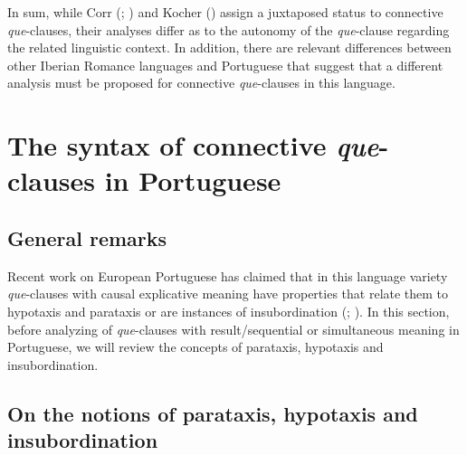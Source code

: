 \documentclass[output=paper,colorlinks,citecolor=brown,
]{langscibook}
\begin{document}
 \label{ex:matos:aproximate}
\z 

In sum, while Corr (\citeyear{corr_ibero-romance_2016}; \citeyear{corr_matrix_2018}) and Kocher (\citeyear{kocher_unselected_2019}) assign a juxtaposed status to connective \textit{que}-clauses, their analyses differ as to the autonomy of the \textit{que}-clause regarding the related linguistic context. In addition, there are relevant differences between other Iberian Romance languages and Portuguese that suggest that a different analysis must be proposed for connective \textit{que}-clauses in this language. 

\section{The syntax of connective \textit{que}-clauses in Portuguese} \label{sec:matos:sect4}

\subsection{General remarks} \label{sec:matos:sect4-1}

Recent work on European Portuguese has claimed that in this language variety \textit{que}-clauses with causal explicative meaning have properties that relate them to hypotaxis and parataxis \citep{colaco_explicative_2016} or are instances of insubordination (\citealt{corr_ibero-romance_2016}; \citeyear{corr_matrix_2018}). In this section, before analyzing of \textit{que}-clauses with result/sequential or simultaneous meaning in Portuguese, we will review the concepts of parataxis, hypotaxis and insubordination.

\subsection{On the notions of parataxis, hypotaxis and insubordination} \label{sec:matos:sect4-2}
\end{document}
